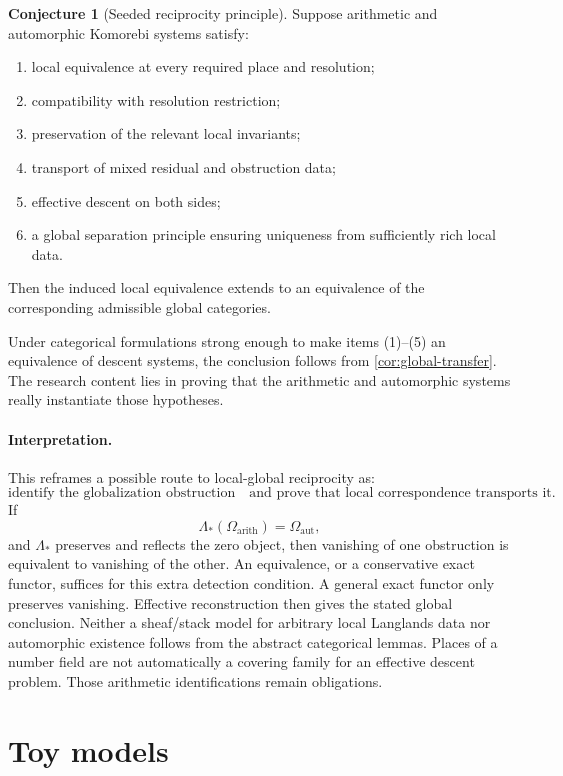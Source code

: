 \documentclass[11pt]{article}
\theoremstyle{definition}
\newtheorem{conjecture}[theorem]{Conjecture}
\theoremstyle{remark}
\begin{document}
\begin{conjecture}[Seeded reciprocity principle]\label{conj:seeded-reciprocity}
Suppose arithmetic and automorphic Komorebi systems satisfy:
\begin{enumerate}
    \item local equivalence at every required place and resolution;
    \item compatibility with resolution restriction;
    \item preservation of the relevant local invariants;
    \item transport of mixed residual and obstruction data;
    \item effective descent on both sides;
    \item a global separation principle ensuring uniqueness from sufficiently rich local data.
\end{enumerate}
Then the induced local equivalence extends to an equivalence of the corresponding admissible global categories.
\end{conjecture}

Under categorical formulations strong enough to make items (1)--(5) an equivalence of descent systems, the conclusion follows from \cref{cor:global-transfer}. The research content lies in proving that the arithmetic and automorphic systems really instantiate those hypotheses.

\paragraph{Interpretation.}
This reframes a possible route to local-global reciprocity as:
\[
\boxed{
\text{identify the globalization obstruction}
\quad\text{and prove that local correspondence transports it.}
}
\]
If
\[
\Lambda_*(\Omega_{\mathrm{arith}})=\Omega_{\mathrm{aut}},
\]
and $\Lambda_*$ preserves and reflects the zero object, then vanishing of one obstruction is equivalent to vanishing of the other. An equivalence, or a conservative exact functor, suffices for this extra detection condition. A general exact functor only preserves vanishing. Effective reconstruction then gives the stated global conclusion. Neither a sheaf/stack model for arbitrary local Langlands data nor automorphic existence follows from the abstract categorical lemmas. Places of a number field are not automatically a covering family for an effective descent problem. Those arithmetic identifications remain obligations.

\section{Toy models}
\end{document}

